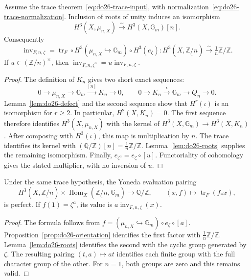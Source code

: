\begin{proposition}
\label{prop:do26-orientation}
Assume the trace theorem~\eqref{eq:do26-trace-input}, with
normalization~\eqref{eq:do26-trace-normalization}.  Inclusion of roots of
unity induces an isomorphism
\[
 H^3(X,\mu_{n,X})\xrightarrow{\sim}
       H^3(X,\mathbb G_m)[n].
\]
Consequently
\begin{equation}
\label{eq:do26-orientation}
 \operatorname{inv}_{F,n,\zeta}
 =\operatorname{tr}_F\circ H^3(\mu_{n,X}\hookrightarrow\mathbb G_m)
                 \circ H^3(e_\zeta)
 :H^3(X,\underline{\mathbb Z/n})
       \xrightarrow{\sim}\tfrac1n\mathbb Z/\mathbb Z.
\end{equation}
If \(u\in(\mathbb Z/n)^\times\), then
\(\operatorname{inv}_{F,n,\zeta^u}
   =u\operatorname{inv}_{F,n,\zeta}\).
\end{proposition}

\begin{proof}
The definition of \(K_n\) gives two short exact sequences:
\[
 0\to\mu_{n,X}\to\mathbb G_m\xrightarrow{[n]}K_n\to0,
 \qquad
 0\to K_n\xrightarrow{\iota}\mathbb G_m\to Q_n\to0.
\]
Lemma~\ref{lem:do26-defect} and the second sequence show that
\(H^r(\iota)\) is an isomorphism for \(r\geq2\).  In particular,
\(H^2(X,K_n)=0\).  The first sequence therefore identifies
\(H^3(X,\mu_{n,X})\) with the kernel of
\(H^3(X,\mathbb G_m)\to H^3(X,K_n)\).
After composing with \(H^3(\iota)\), this map is multiplication by
\(n\).  The trace identifies its kernel with
\((\mathbb Q/\mathbb Z)[n]=\tfrac1n\mathbb Z/\mathbb Z\).
Lemma~\ref{lem:do26-roots} supplies the remaining isomorphism.
Finally, \(e_{\zeta^u}=e_\zeta\circ[u]\).  Functoriality of
cohomology gives the stated multiplier, with no inversion of \(u\).
\end{proof}

\begin{corollary}
\label{cor:do26-duality}
Under the same trace hypothesis, the Yoneda evaluation pairing
\[
 H^3(X,\underline{\mathbb Z/n})\times
 \operatorname{Hom}_X(\underline{\mathbb Z/n},\mathbb G_m)
 \longrightarrow\mathbb Q/\mathbb Z,
 \qquad(x,f)\longmapsto\operatorname{tr}_F(f_*x),
\]
is perfect.  If \(f(1)=\zeta^a\), its value is
\(a\operatorname{inv}_{F,n,\zeta}(x)\).
\end{corollary}

\begin{proof}
The formula follows from \(f=(\mu_{n,X}\hookrightarrow\mathbb G_m)
\circ e_\zeta\circ[a]\).  Proposition~\ref{prop:do26-orientation}
identifies the first factor with \(\tfrac1n\mathbb Z/\mathbb Z\).
Lemma~\ref{lem:do26-roots} identifies the second with the cyclic group
generated by \(\zeta\).  The resulting pairing \((t,a)\mapsto at\)
identifies each finite group with the full character group of the other.
For \(n=1\), both groups are zero and this remains valid.
\end{proof}

